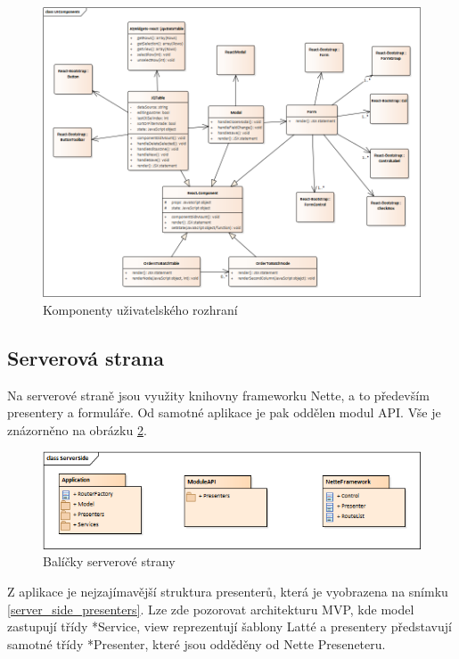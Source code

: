 \documentclass[thesis=B,czech]{FITthesis}[2012/06/26]
\begin{document}
\begin{figure}
	\includegraphics[width=\textwidth]{UI_components.png}
	\caption{Komponenty uživatelského rozhraní}\label{ui_komponents}
\end{figure}

\subsection{Serverová strana}
	Na serverové straně jsou využity knihovny frameworku Nette, a to především presentery a formuláře. Od samotné aplikace je pak oddělen modul API. Vše je znázorněno na obrázku \ref{server_side}.
	
\begin{figure}
	\includegraphics[width=\textwidth]{server_side.png}
	\caption{Balíčky serverové strany}\label{server_side}
\end{figure}

	Z aplikace je nejzajímavější struktura presenterů, která je vyobrazena na snímku \ref{server_side_presenters}. Lze zde pozorovat architekturu MVP, kde model zastupují třídy *Service, view reprezentují šablony Latté a presentery představují samotné třídy *Presenter, které jsou odděděny od Nette Preseneteru.
\end{document}
